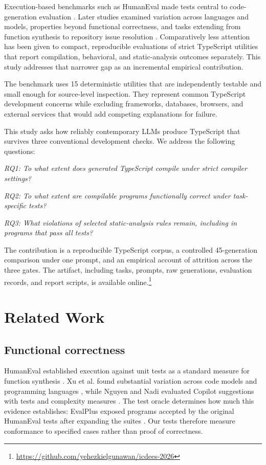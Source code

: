 \documentclass[conference]{IEEEtran}
\begin{document}
Execution-based benchmarks such as HumanEval made tests central to code-generation evaluation \cite{chen2021humaneval}. Later studies examined variation across languages and models, properties beyond functional correctness, and tasks extending from function synthesis to repository issue resolution \cite{xu2022systematic,nguyen2022copilot,yetistiren2022quality,du2024classeval,jimenez2024swebench}. Comparatively less attention has been given to compact, reproducible evaluations of strict TypeScript utilities that report compilation, behavioral, and static-analysis outcomes separately. This study addresses that narrower gap as an incremental empirical contribution.

The benchmark uses 15 deterministic utilities that are independently testable and small enough for source-level inspection. They represent common TypeScript development concerns while excluding frameworks, databases, browsers, and external services that would add competing explanations for failure.

This study asks how reliably contemporary LLMs produce TypeScript that survives three conventional development checks. We address the following questions:

\textit{RQ1: To what extent does generated TypeScript compile under strict compiler settings?}

\textit{RQ2: To what extent are compilable programs functionally correct under task-specific tests?}

\textit{RQ3: What violations of selected static-analysis rules remain, including in programs that pass all tests?}

The contribution is a reproducible TypeScript corpus, a controlled 45-generation comparison under one prompt, and an empirical account of attrition across the three gates. The artifact, including tasks, prompts, raw generations, evaluation records, and report scripts, is available online.\footnote{\url{https://github.com/yehezkielgunawan/icdees-2026}}

\section{Related Work}
\subsection{Functional correctness}
HumanEval established execution against unit tests as a standard measure for function synthesis \cite{chen2021humaneval}. Xu et al. found substantial variation across code models and programming languages \cite{xu2022systematic}, while Nguyen and Nadi evaluated Copilot suggestions with tests and complexity measures \cite{nguyen2022copilot}. The test oracle determines how much this evidence establishes: EvalPlus exposed programs accepted by the original HumanEval tests after expanding the suites \cite{liu2023evalplus}. Our tests therefore measure conformance to specified cases rather than proof of correctness.
\end{document}
